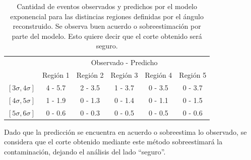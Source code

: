 	\begin{table}[h!]
	\begin{center}
		\renewcommand{\arraystretch}{1.4}
		\footnotesize
	 \begin{tabular}{|c|c|c|c|c|c|}
	 \hline
	 & \multicolumn{5}{c|}{Observado - Predicho} \\
	 & Región 1 & Región 2 & Región 3 & Región 4 & Región 5 \\
	 \hline
	 $[3\sigma, 4\sigma]$ & 4 - 5.7 &2 - 3.5 & 1 - 3.7 & 0 - 3.5 & 0 - 3.7 \\
	 $[4\sigma, 5\sigma]$ & 1 - 1.9 & 0 - 1.3 & 0 - 1.4 & 0 - 1.1 & 0 - 1.5 \\
	 $[5\sigma, 6\sigma]$ & 0 - 0.6 & 0 - 0.3 & 0 - 0.5 & 0 - 0.5 & 0 - 0.6 \\
	 \hline
	 \end{tabular}
	 \caption{Cantidad de eventos observados y predichos por el modelo exponencial para las distincias regiones definidas por el ángulo reconstruido. Se observa buen acuerdo o sobreestimación por parte del modelo. Esto quiere decir que el corte obtenido será seguro.}
	 \label{tab:predDGL}
	\end{center}
	\end{table}
	Dado que la predicción se encuentra en acuerdo o sobreestima lo observado, se considera que el corte obtenido mediante este método sobreestimará la contaminación, dejando el análisis del lado ``seguro''.
	

